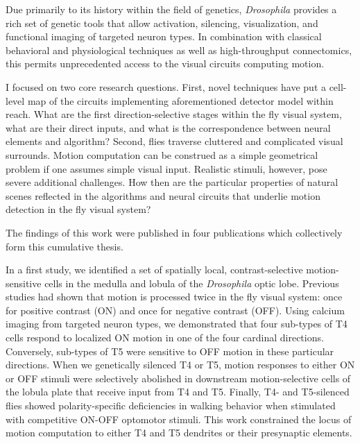 Due primarily to its history within the field of genetics, \textit{Drosophila} provides a rich set of genetic tools that allow activation, silencing, visualization, and functional imaging of targeted neuron types. In combination with classical behavioral and physiological techniques as well as high-throughput connectomics, this permits unprecedented access to the visual circuits computing motion.

I focused on two core research questions. First, novel techniques have put a cell-level map of the circuits implementing aforementioned detector model within reach. What are the first direction-selective stages within the fly visual system, what are their direct inputs, and what is the correspondence between neural elements and algorithm? Second, flies traverse cluttered and complicated visual surrounds. Motion computation can be construed as a simple geometrical problem if one assumes simple visual input. Realistic stimuli, however, pose severe additional challenges. How then are the particular properties of natural scenes reflected in the algorithms and neural circuits that underlie motion detection in the fly visual system?

The findings of this work were published in four publications which collectively form this cumulative thesis.

In a first study, we identified a set of spatially local, contrast-selective motion-sensitive cells in the medulla and lobula of the \textit{Drosophila} optic lobe. Previous studies had shown that motion is processed twice in the fly visual system: once for positive contrast (ON) and once for negative contrast (OFF). Using calcium imaging from targeted neuron types, we demonstrated that four sub-types of T4 cells respond to localized ON motion in one of the four cardinal directions. Conversely, sub-types of T5 were sensitive to OFF motion in these particular directions. When we genetically silenced T4 or T5, motion responses to either ON or OFF stimuli were selectively abolished in downstream motion-selective cells of the lobula plate that receive input from T4 and T5. Finally, T4- and T5-silenced flies showed polarity-specific deficiencies in walking behavior when stimulated with competitive ON-OFF optomotor stimuli. This work constrained the locus of motion computation to either T4 and T5 dendrites or their presynaptic elements.

